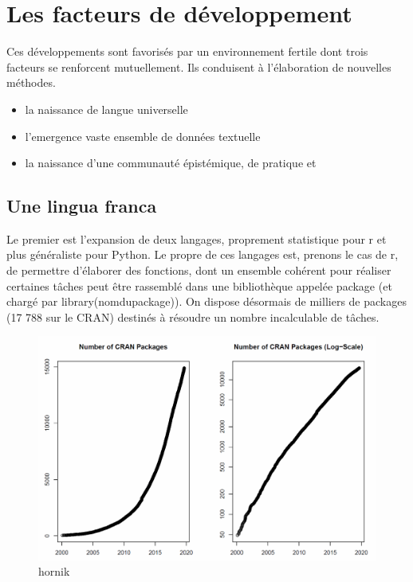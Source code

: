 \documentclass[
]{book}
\providecommand{\tightlist}{%
  \setlength{\itemsep}{0pt}\setlength{\parskip}{0pt}}
\begin{document}
\hypertarget{les-facteurs-de-duxe9veloppement}{%
\section{Les facteurs de développement}\label{les-facteurs-de-duxe9veloppement}}

Ces développements sont favorisés par un environnement fertile dont trois facteurs se renforcent mutuellement. Ils conduisent à l'élaboration de nouvelles méthodes.

\begin{itemize}
\tightlist
\item
  la naissance de langue universelle
\item
  l'emergence vaste ensemble de données textuelle
\item
  la naissance d'une communauté épistémique, de pratique et
\end{itemize}

\hypertarget{une-lingua-franca}{%
\subsection{Une lingua franca}\label{une-lingua-franca}}

Le premier est l'expansion de deux langages, proprement statistique pour r et plus généraliste pour Python. Le propre de ces langages est, prenons le cas de r, de permettre d'élaborer des fonctions, dont un ensemble cohérent pour réaliser certaines tâches peut être rassemblé dans une bibliothèque appelée package (et chargé par library(nomdupackage)). On dispose désormais de milliers de packages (17 788 sur le CRAN) destinés à résoudre un nombre incalculable de tâches.

\begin{figure}
\centering
\includegraphics{number_CRAN_packages.png}
\caption{hornik}
\end{figure}
\end{document}
